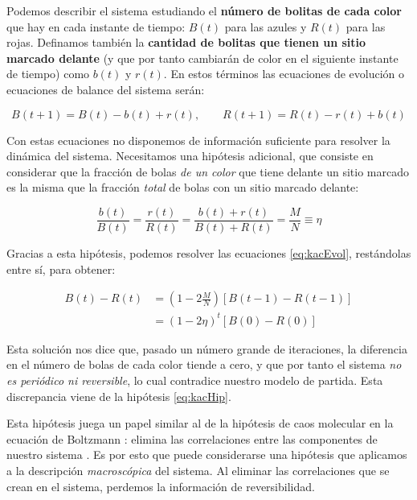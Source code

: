 \documentclass[11pt, a4paper]{article} %
\theoremstyle{named}
\begin{document}
Podemos describir el sistema estudiando el \textbf{número de bolitas de cada color} que hay en cada instante de tiempo: $B(t)$ para las azules y $R(t)$ para las rojas. Definamos también la \textbf{cantidad de bolitas que tienen un sitio marcado delante} (y que por tanto cambiarán de color en el siguiente instante de tiempo) como $b(t)$ y $r(t)$. En estos términos las ecuaciones de evolución o ecuaciones de balance del sistema serán:

\begin{equation}\label{eq:kacEvol}
B(t+1) = B(t) - b(t) + r(t), \qquad
R(t+1) = R(t) - r(t) + b(t)
\end{equation}

Con estas ecuaciones no disponemos de información suficiente para resolver la dinámica del sistema. Necesitamos una hipótesis adicional, que consiste en considerar que la fracción de bolas \textit{de un color} que tiene delante un sitio marcado es la misma que la fracción \textit{total} de bolas con un sitio marcado delante:

\begin{equation}\label{eq:kacHip}
\frac{b(t)}{B(t)} = \frac{r(t)}{R(t)} = \frac{b(t) + r(t)}{B(t) + R(t)} = \frac{M}{N} \equiv \eta
\end{equation}

Gracias a esta hipótesis, podemos resolver las ecuaciones \eqref{eq:kacEvol}, restándolas entre sí, para obtener:

\begin{equation}\label{eq_kacSol}
\begin{aligned}
B(t)-R(t) &=\left(1-2 \frac{M}{N}\right)\left[B(t-1)-R(t-1)\right] \\
&=\left(1-2 \eta\right)^{t}\left[B(0)-R(0)\right]
\end{aligned}
\end{equation}

Esta solución nos dice que, pasado un número grande de iteraciones, la diferencia en el número de bolas de cada color tiende a cero, y que por tanto el sistema \textit{no es periódico ni reversible}, lo cual contradice nuestro modelo de partida. Esta discrepancia viene de la hipótesis \eqref{eq:kacHip}.

Esta hipótesis juega un papel similar al de la hipótesis de caos molecular en la ecuación de Boltzmann \cite{haro}: elimina las correlaciones entre las componentes de nuestro sistema \cite{gottwald}. Es por esto que puede considerarse una hipótesis que aplicamos a la descripción \textit{macroscópica} del sistema. Al eliminar las correlaciones que se crean en el sistema, perdemos la información de reversibilidad.
\end{document}
